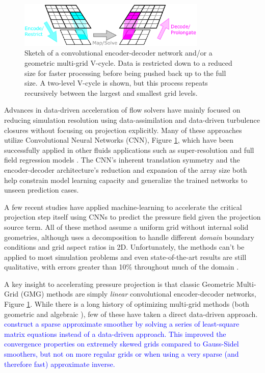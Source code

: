 \documentclass[review]{elsarticle}
\begin{document}
\begin{figure}
    \centering
    \includegraphics[width=0.8\textwidth]{figures/drawing}
    \caption{Sketch of a convolutional encoder-decoder network and/or a geometric multi-grid V-cycle. Data is restricted down to a reduced size for faster processing before being pushed back up to the full size. A two-level V-cycle is shown, but this process repeats recursively between the largest and smallest grid levels.}
    \label{fig:multigrid}
\end{figure}

Advances in data-driven acceleration of flow solvers have mainly focused on reducing simulation resolution using data-assimilation and data-driven turbulence closures \cite{asch2016data,BECK2019108910,maulik_san_rasheed_vedula_2019,ling_kurzawski_templeton_2016,font2021deep} without focusing on projection explicitly. Many of these approaches utilize Convolutional Neural Networks (CNN), Figure \ref{fig:multigrid}, which have been successfully applied in other fluids applications such as super-resolution \cite{liu2020deep} and full field regression models \cite{bhatnagar2019prediction}. The CNN's inherent translation symmetry and the encoder-decoder architecture's reduction and expansion of the array size both help constrain model learning capacity and generalize the trained networks to unseen prediction cases. 

A few recent studies have applied machine-learning to accelerate the critical projection step itself \cite{ozbay2021poisson,Xiao2020,ajuria2020} using CNNs to predict the pressure field given the projection source term. All of these method assume a uniform grid without internal solid geometries, although \cite{ozbay2021poisson} uses a decomposition to handle different \textit{domain} boundary conditions and grid aspect ratios in 2D. Unfortunately, the methods can't be applied to most simulation problems and even state-of-the-art results are still qualitative, with errors greater than 10\% throughout much of the domain \cite{ozbay2021poisson}. 

A key insight to accelerating pressure projection is that classic Geometric Multi-Grid (GMG) methods \cite{briggs2000multigrid} are simply \textit{linear} convolutional encoder-decoder networks, Figure \ref{fig:multigrid}. While there is a long history of optimizing multi-grid methods (both geometric \cite{tang2000sparse} and algebraic \cite{brezina2006adaptive}), few of these have taken a direct data-driven approach. \textcolor{blue}{\cite{tang2000sparse} construct a sparse approximate smoother by solving a series of least-square matrix equations instead of a data-driven approach. This improved the convergence properties on extremely skewed grids compared to Gauss-Sidel smoothers, but not on more regular grids or when using a very sparse (and therefore fast) approximate inverse.} 
\end{document}
